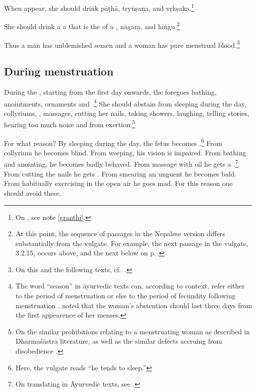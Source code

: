 \begin{translation}
\item[14ab]
 
 When  appear, she should drink \gls{pāṭhā}, 
 \gls{tryūṣaṇa}, and \gls{vṛkṣaka}.\footnote{On , see note 
 \ref{granthi}.}
 
 \item[14.add1] 
 
 She should drink a a  that is the
 of  a , \gls{nāgara},
and \gls{hiṅgu}.\footnote{At this point, the sequence of passages in the 
Nepalese version differs substantially from the vulgate.  For example, the next 
passage in the vulgate, 3.2.15, occurs above, and the next below on 
p.\,\pageref{3.2.15}.}
 
\item[24]

Thus a man has unblemished semen and a woman has pure menstrual 
blood.\footnote{On this and the following texts, cf.\ \cite[389 et 
passim]{smet-2010}.}
 
 \subsection{During menstruation}
 
 \item[25]
 \label{3.2.25}
During the , starting from the first day onwards, the
 foregoes bathing, anointments,
ornaments and .\footnote{The word 
    “season” in āyurvedic texts can, according to context, refer either to
    the period of menstruation or else to the period of fecundity
    following menstruation \citep[15\,ff., note 27, \emph{et
    passim}]{das-2003}.  noted that the woman's
    abstention should last three days from the first appearence of her
    menses.} She should abstain from sleeping during the day, collyriums,
    , massages, cutting her nails, taking
    showers, laughing, telling stories, hearing too much noise and from
    exertion.\footnote{On the similar prohibitions relating to a
        menstruating woman as described in Dharmaśāstra literature, as well as
        the similar defects accruing from disobedience         
        \citep[see][284--287]{lesl-1989}.}
        
For what reason?  By sleeping during the day, the fetus becomes
.\footnote{Here, the vulgate reads  “he
    tends to sleep.”} From collyrium he becomes blind.  From weeping, his
    vision is impaired. From bathing and anointing, he becomes badly
    behaved. From massage with oil he gets a .\footnote{On translating  in Āyurvedic texts, see
        \cite[96\,ff]{emme-1984}.} From cutting the nails he gets
        .  From smearing an unguent he becomes bald.
        From habitually exercising in the open air he goes mad. For this
        reason one should avoid these.
    

\end{translation}
